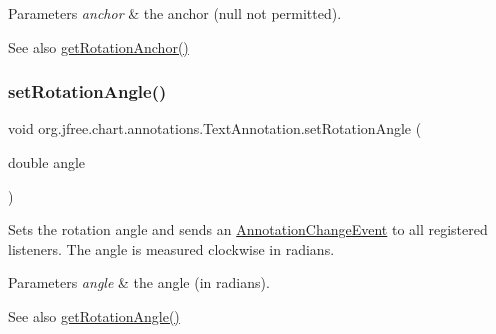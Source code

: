 \begin{DoxyParams}{Parameters}
{\em anchor} & the anchor ({\ttfamily null} not permitted).\\
\hline
\end{DoxyParams}
\begin{DoxySeeAlso}{See also}
\mbox{\hyperlink{classorg_1_1jfree_1_1chart_1_1annotations_1_1_text_annotation_ab97800ba02a4576842f56a1f3b665f53}{get\+Rotation\+Anchor()}} 
\end{DoxySeeAlso}
\mbox{\label{classorg_1_1jfree_1_1chart_1_1annotations_1_1_text_annotation_ac629e4dd9695447f5a41e87a65436af7}} 
\subsubsection{\texorpdfstring{set\+Rotation\+Angle()}{setRotationAngle()}}
{\footnotesize\ttfamily void org.\+jfree.\+chart.\+annotations.\+Text\+Annotation.\+set\+Rotation\+Angle (\begin{DoxyParamCaption}\item[{double}]{angle }\end{DoxyParamCaption})}

Sets the rotation angle and sends an \mbox{\hyperlink{}{Annotation\+Change\+Event}} to all registered listeners. The angle is measured clockwise in radians.


\begin{DoxyParams}{Parameters}
{\em angle} & the angle (in radians).\\
\hline
\end{DoxyParams}
\begin{DoxySeeAlso}{See also}
\mbox{\hyperlink{classorg_1_1jfree_1_1chart_1_1annotations_1_1_text_annotation_ade23fab527551f75375563c2a138e3c0}{get\+Rotation\+Angle()}} 
\end{DoxySeeAlso}
\mbox{\label{classorg_1_1jfree_1_1chart_1_1annotations_1_1_text_annotation_a5f98bba3af3dff49aec055bea1737951}} 
